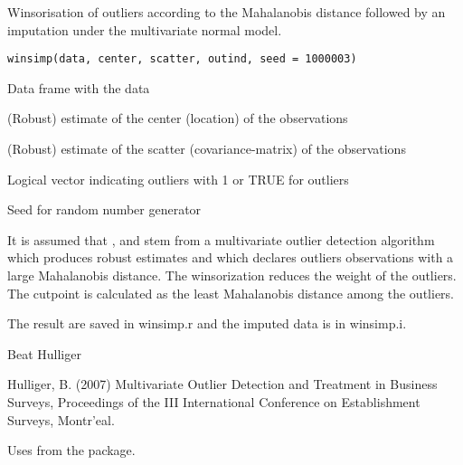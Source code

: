 %
\begin{Description}\relax
Winsorisation of outliers according to the Mahalanobis distance followed by an imputation under the multivariate normal model.
\end{Description}
%
\begin{Usage}
\begin{verbatim}
winsimp(data, center, scatter, outind, seed = 1000003)
\end{verbatim}
\end{Usage}
%
\begin{Arguments}
\begin{ldescription}
\item[\code{data}] Data frame with the data
\item[\code{center}] (Robust) estimate of the center (location) of the observations
\item[\code{scatter}] (Robust) estimate of the scatter (covariance-matrix) of the observations
\item[\code{outind}] Logical vector indicating outliers with 1 or TRUE for outliers
\item[\code{seed}] Seed for random number generator
\end{ldescription}
\end{Arguments}
%
\begin{Details}\relax
It is assumed that ,  and  stem from a multivariate outlier detection algorithm which produces robust estimates and which declares outliers observations with a large Mahalanobis distance. The winsorization reduces the weight of the outliers. The cutpoint is calculated as the least Mahalanobis distance among the outliers. 
\end{Details}
%
\begin{Value}
The result are saved in winsimp.r and the imputed data is in winsimp.i.
\end{Value}
%
\begin{Author}\relax
Beat Hulliger
\end{Author}
%
\begin{References}\relax
Hulliger, B. (2007) Multivariate Outlier Detection and Treatment in Business Surveys, Proceedings of the III International Conference on Establishment Surveys, Montr\bsl{}'eal.
\end{References}
%
\begin{SeeAlso}\relax
Uses  from the  package.
\end{SeeAlso}
%
\begin{Examples}
\end{Examples}
